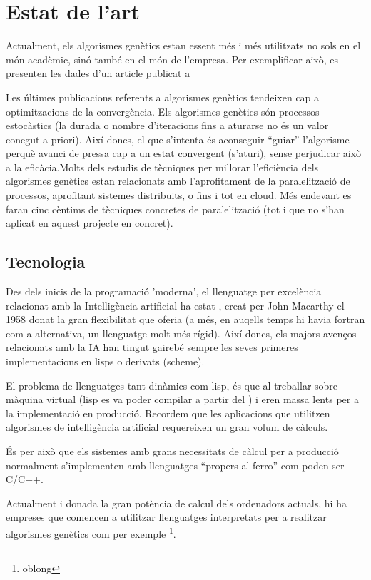\documentclass[a4paper]{article}
\begin{document}

\section{Estat de l'art} %
\label{sec:Estat de l'art}

Actualment, els algorismes genètics estan essent més i més utilitzats no sols en
el món acadèmic, sinó també en el món de l'empresa.  Per exemplificar això, es
presenten les dades d'un article publicat a 

Les últimes publicacions referents a algorismes genètics tendeixen cap a
optimitzacions de la convergència.  Els algorismes genètics són processos
estocàstics (la durada o nombre d'iteracions fins a aturarse no és un valor
conegut a priori).  Així doncs, el que s'intenta és aconseguir ``guiar''
l'algorisme perquè avanci de pressa cap a un estat convergent (s'aturi), sense
perjudicar això a la eficàcia.Molts dels estudis de tècniques per millorar
l'eficiència dels algorismes genètics estan relacionats amb l'aprofitament de la
paralelització de processos, aprofitant sistemes distribuits, o fins i tot en
cloud.  Més endevant es faran cinc cèntims de tècniques concretes de
paralelització (tot i que no s'han aplicat en aquest projecte en concret).

\subsection{Tecnologia} %
\label{sub:Tecnologia}

Des dels inicis de la programació 'moderna', el llenguatge per excelència
relacionat amb la Intelligència artificial ha estat \cite{LISP}, creat per John
Macarthy el 1958 donat la gran flexibilitat que oferia (a més, en auqells temps
hi havia fortran com a alternativa, un llenguatge molt més rígid).  Així doncs,
els majors avenços relacionats amb la IA han tingut gairebé sempre les seves
primeres implementacions en lisps o derivats (scheme).  

El problema de llenguatges tant dinàmics com lisp, és que al treballar sobre
màquina virtual (lisp es va poder compilar a partir del %
) i eren massa lents per a la implementació en producció.  Recordem que les
aplicacions que utilitzen algorismes de intelligència artificial requereixen un
gran volum de càlculs.

És per això que els sistemes amb grans necessitats de càlcul per a producció
normalment s'implementen amb llenguatges ``propers al ferro'' com poden ser
C/C++. 

Actualment i donada la gran potència de calcul dels ordenadors actuals, hi ha
empreses que comencen a utilitzar llenguatges interpretats per a realitzar
algorismes genètics  com per exemple \footnote{oblong}.

\end{document}
